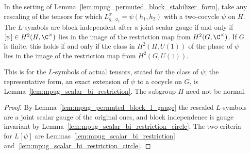 \begin{lemma}
    \label{lem:mpug_permuted_block_bi_extension}
    \leanok
    In the setting of Lemma~\ref{lem:mpug_permuted_block_stabilizer_form},
    take any rescaling of the tensors for which $L^x_{g_1,g_2}=\psi(h_1,h_2)$
    with a two-cocycle $\psi$ on $H$. The $L$-symbols are block independent
    after a joint scalar gauge if and only if $[\psi]\in H^2(H,\C^\times)$
    lies in the image of the restriction map from $H^2(G,\C^\times)$. If $G$
    is finite, this holds if and only if the class in $H^2(H,U(1))$ of the
    phase of $\psi$ lies in the image of the restriction map from
    $H^2(G,U(1))$.

    This is \cite[lines~7042--7064]{FrancoRubio2025MPUGauging} for the
    $L$-symbols of actual tensors, stated for the class of $\psi$; the
    representative form, an exact extension of $\psi$ to a cocycle on $G$, is
    Lemma~\ref{lem:mpug_scalar_bi_restriction}. The subgroup $H$ need not be
    normal.
\end{lemma}

\begin{proof}\leanok
    By Lemma~\ref{lem:mpug_permuted_block_l_gauge} the rescaled $L$-symbols
    are a joint scalar gauge of the original ones, and block independence is
    gauge invariant by Lemma~\ref{lem:mpug_scalar_bi_restriction_circle}.
    The two criteria for $L[\psi]$ are
    Lemmas~\ref{lem:mpug_scalar_bi_restriction}
    and~\ref{lem:mpug_scalar_bi_restriction_circle}.
\end{proof}

